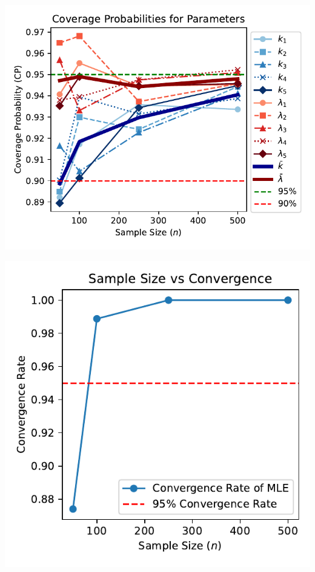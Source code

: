 \documentclass{article}
\begin{document}

\noindent
\begin{minipage}[t]{0.55\textwidth}
  \centering
  \includegraphics[width=\textwidth,height=0.33\textheight,keepaspectratio]{plot-n-vs-cp.pdf}
\end{minipage}%
\begin{minipage}[t]{0.4\textwidth}
  \centering
  \includegraphics[width=\textwidth,height=0.33\textheight,keepaspectratio]{n_vs_convergence.pdf}
\end{minipage}
\end{document}
